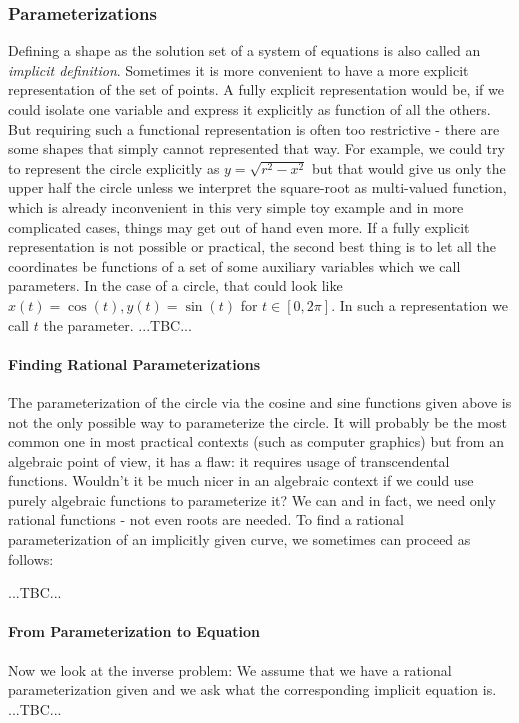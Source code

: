 \subsubsection{Parameterizations}
Defining a shape as the solution set of a system of equations is also called an \emph{implicit definition}. Sometimes it is more convenient to have a more explicit representation of the set of points. A fully explicit representation would be, if we could isolate one variable and express it explicitly as function of all the others. But requiring such a functional representation is often too restrictive - there are some shapes that simply cannot represented that way. For example, we could try to represent the circle explicitly as $y = \sqrt{r^2 - x^2}$ but that would give us only the upper half the circle unless we interpret the square-root as multi-valued function, which is already inconvenient in this very simple toy example and in more complicated cases, things may get out of hand even more. If a fully explicit representation is not possible or practical, the second best thing is to let all the coordinates be functions of a set of some auxiliary variables which we call parameters. In the case of a circle, that could look like $x(t) = \cos(t), y(t) = \sin(t)$ for $t \in [0, 2 \pi]$. In such a representation we call $t$ the parameter.
...TBC...

\paragraph{Finding Rational Parameterizations}
The parameterization of the circle via the cosine and sine functions given above is not the only possible way to parameterize the circle. It will probably be the most common one in most practical contexts (such as computer graphics) but from an algebraic point of view, it has a flaw: it requires usage of transcendental functions. Wouldn't it be much nicer in an algebraic context if we could use purely algebraic functions to parameterize it? We can and in fact, we need only rational functions - not even roots are needed. To find a rational parameterization of an implicitly given curve, we sometimes can proceed as follows:

...TBC...

\paragraph{From Parameterization to Equation}
Now we look at the inverse problem: We assume that we have a rational parameterization given and we ask what the corresponding implicit equation is. ...TBC...

